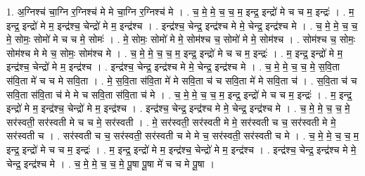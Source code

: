 \documentclass[17pt]{extarticle}
\begin{document}
1. अ॒ग्निश्च॑ चा॒ग्नि र॒ग्निश्च॑ मे मे चा॒ग्नि र॒ग्निश्च॑ मे । . च॒ मे॒ मे॒ च॒ च॒ म॒ इन्द्र॒ इन्द्रो॑ मे च च म॒ इन्द्रः॑ । . म॒ इन्द्र॒ इन्द्रो॑ मे म॒ इन्द्र॑श्च॒ चेन्द्रो॑ मे म॒ इन्द्र॑श्च । . इन्द्र॑श्च॒ चेन्द्र॒ इन्द्र॑श्च मे मे॒ चेन्द्र॒ इन्द्र॑श्च मे । . च॒ मे॒ मे॒ च॒ च॒ मे॒ सोमः॒ सोमो॑ मे च च मे॒ सोमः॑ । . मे॒ सोमः॒ सोमो॑ मे मे॒ सोम॑श्च च॒ सोमो॑ मे मे॒ सोम॑श्च । . सोम॑श्च च॒ सोमः॒ सोम॑श्च मे मे च॒ सोमः॒ सोम॑श्च मे । . च॒ मे॒ मे॒ च॒ च॒ म॒ इन्द्र॒ इन्द्रो॑ मे च च म॒ इन्द्रः॑ । . म॒ इन्द्र॒ इन्द्रो॑ मे म॒ इन्द्र॑श्च॒ चेन्द्रो॑ मे म॒ इन्द्र॑श्च । . इन्द्र॑श्च॒ चेन्द्र॒ इन्द्र॑श्च मे मे॒ चेन्द्र॒ इन्द्र॑श्च मे । . च॒ मे॒ मे॒ च॒ च॒ मे॒ स॒वि॒ता स॑वि॒ता मे॑ च च मे सवि॒ता । . मे॒ स॒वि॒ता स॑वि॒ता मे॑ मे सवि॒ता च॑ च सवि॒ता मे॑ मे सवि॒ता च॑ । . स॒वि॒ता च॑ च सवि॒ता स॑वि॒ता च॑ मे मे च सवि॒ता स॑वि॒ता च॑ मे । . च॒ मे॒ मे॒ च॒ च॒ म॒ इन्द्र॒ इन्द्रो॑ मे च च म॒ इन्द्रः॑ । . म॒ इन्द्र॒ इन्द्रो॑ मे म॒ इन्द्र॑श्च॒ चेन्द्रो॑ मे म॒ इन्द्र॑श्च । . इन्द्र॑श्च॒ चेन्द्र॒ इन्द्र॑श्च मे मे॒ चेन्द्र॒ इन्द्र॑श्च मे । . च॒ मे॒ मे॒ च॒ च॒ मे॒ सर॑स्वती॒ सर॑स्वती मे च च मे॒ सर॑स्वती । . मे॒ सर॑स्वती॒ सर॑स्वती मे मे॒ सर॑स्वती च च॒ सर॑स्वती मे मे॒ सर॑स्वती च । . सर॑स्वती च च॒ सर॑स्वती॒ सर॑स्वती च मे मे च॒ सर॑स्वती॒ सर॑स्वती च मे । . च॒ मे॒ मे॒ च॒ च॒ म॒ इन्द्र॒ इन्द्रो॑ मे च च म॒ इन्द्रः॑ । . म॒ इन्द्र॒ इन्द्रो॑ मे म॒ इन्द्र॑श्च॒ चेन्द्रो॑ मे म॒ इन्द्र॑श्च । . इन्द्र॑श्च॒ चेन्द्र॒ इन्द्र॑श्च मे मे॒ चेन्द्र॒ इन्द्र॑श्च मे । . च॒ मे॒ मे॒ च॒ च॒ मे॒ पू॒षा पू॒षा मे॑ च च मे पू॒षा । \newline
\end{document}
